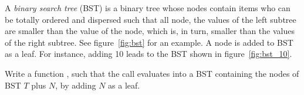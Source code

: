 A \emph{binary search tree} (BST) is a binary tree whose nodes contain
items who can be totally ordered and dispersed such that all node, the
values of the left subtree are smaller than the value of the node,
which is, in turn, smaller than the values of the right subtree. See
figure~\ref{fig:bst} for an example.
A node is added to BST as a leaf. For instance, adding 10 leads to the
BST shown in figure~\ref{fig:bst_10}.
\begin{figure}[!h]
\centering
{}
\qquad
{}
\end{figure}
Write a function , such that the call
 evaluates into a BST containing the nodes
of BST \(T\) plus \(N\), by adding \(N\) as a leaf.
